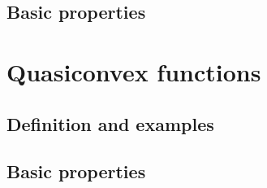 \begin{example}
\end{example}
\begin{example}
\end{example}
\begin{example}
\end{example}
\begin{example}
\end{example}
\begin{example}
\end{example}
\begin{example}
\end{example}
\begin{example}
\end{example}

\subsection{Basic properties}

\section{Quasiconvex functions}

\subsection{Definition and examples}
\begin{example}
\end{example}
\begin{example}
\end{example}
\begin{example}
\end{example}
\begin{example}
\end{example}
\begin{example}
\end{example}
\begin{example}
\end{example}

\subsection{Basic properties}
\begin{example}
\end{example}
\begin{example}
\end{example}

